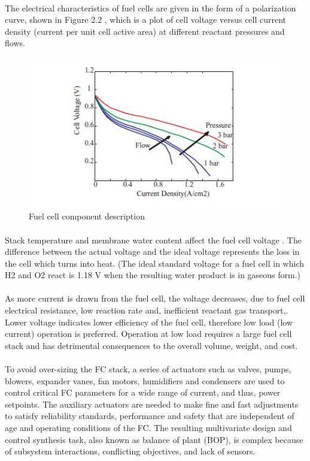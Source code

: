 \paragraph{}The electrical characteristics of fuel cells are given in the form of a polarization curve, shown in Figure 2.2 , which is a plot of cell voltage versus cell current density (current per unit cell active area) at different reactant pressures and flows.
\begin{figure}[!h]
\includegraphics{Figures/Figure6}
\caption{Fuel cell component description
\cite{stefanopoulou_mechatronics_nodate}}
\end{figure}
\paragraph{}Stack temperature and membrane water content affect the fuel cell voltage \cite{ehsani_modern_2018}. The difference between the actual voltage and the ideal voltage represents the loss in the cell which turns into heat. (The ideal standard voltage for a fuel cell in which H2 and O2 react is 1.18 V when the resulting water product is in gaseous form.)
\paragraph{}As more current is drawn from the fuel cell, the voltage decreases, due to fuel cell electrical resistance, low reaction rate and, inefficient reactant gas transport,. Lower voltage indicates lower efficiency of the fuel cell, therefore low load (low current) operation is preferred. Operation at low load requires a large fuel cell stack and has detrimental consequences to the overall volume, weight, and cost.
\paragraph{}To avoid over-sizing the FC stack, a series of actuators such as valves, pumps, blowers, expander vanes, fan motors, humidifiers and condensers are used to control critical FC parameters for a wide range of current, and thus, power setpoints. The auxiliary actuators are needed to make fine and fast adjustments to satisfy reliability standards, performance and safety that are independent of age and operating conditions of the FC. The resulting multivariate design and control synthesis task, also known as balance of plant (BOP), is complex because of subsystem interactions, conflicting objectives, and lack of sensors.
